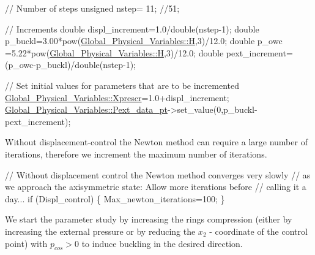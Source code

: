\begin{DoxyCodeInclude}
 \textcolor{comment}{// Number of steps}
 \textcolor{keywordtype}{unsigned} nstep= 11; \textcolor{comment}{//51;}
 
 \textcolor{comment}{// Increments}
 \textcolor{keywordtype}{double} displ\_increment=1.0/double(nstep-1);
 \textcolor{keywordtype}{double} p\_buckl=3.00*pow(\hyperlink{namespaceGlobal__Physical__Variables_af6e07423e22c0991084d9a2f43727805}{Global\_Physical\_Variables::H},3)/12.0;
 \textcolor{keywordtype}{double} p\_owc  =5.22*pow(\hyperlink{namespaceGlobal__Physical__Variables_af6e07423e22c0991084d9a2f43727805}{Global\_Physical\_Variables::H},3)/12.0;
 \textcolor{keywordtype}{double} pext\_increment=(p\_owc-p\_buckl)/\textcolor{keywordtype}{double}(nstep-1); 
 
 \textcolor{comment}{// Set initial values for parameters that are to be incremented}
 \hyperlink{namespaceGlobal__Physical__Variables_a1c774c9cb221df909201e81e84b15f40}{Global\_Physical\_Variables::Xprescr}=1.0+displ\_increment;
 \hyperlink{namespaceGlobal__Physical__Variables_a9d598320fb3d7ecf94101088e8f376d2}{Global\_Physical\_Variables::Pext\_data\_pt}->set\_value(0,p\_buckl-
      pext\_increment);

\end{DoxyCodeInclude}


Without displacement-\/control the Newton method can require a large number of iterations, therefore we increment the maximum number of iterations.


\begin{DoxyCodeInclude}
 \textcolor{comment}{// Without displacement control the Newton method converges very slowly}
 \textcolor{comment}{// as we approach the axisymmetric state: Allow more iterations before}
 \textcolor{comment}{// calling it a day...}
 \textcolor{keywordflow}{if} (Displ\_control)
  \{
   Max\_newton\_iterations=100;
  \}

\end{DoxyCodeInclude}


We start the parameter study by increasing the ring\textquotesingle{}s compression (either by increasing the external pressure or by reducing the $ x_2$ -\/ coordinate of the control point) with $ p_{cos} > 0 $ to induce buckling in the desired direction.


